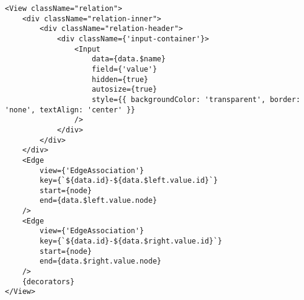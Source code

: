 \begin{lstlisting}[language=JSX-template,caption=ERD Relation template.,label=lst:relation-template]
<View className="relation">
    <div className="relation-inner">
        <div className="relation-header">
            <div className={'input-container'}>
                <Input
                    data={data.$name}
                    field={'value'}
                    hidden={true}
                    autosize={true}
                    style={{ backgroundColor: 'transparent', border: 'none', textAlign: 'center' }}
                />
            </div>
        </div>
    </div>
    <Edge
        view={'EdgeAssociation'} 
        key={`${data.id}-${data.$left.value.id}`}
        start={node} 
        end={data.$left.value.node} 
    />
    <Edge
        view={'EdgeAssociation'} 
        key={`${data.id}-${data.$right.value.id}`}
        start={node} 
        end={data.$right.value.node} 
    />
    {decorators}
</View>
\end{lstlisting}


